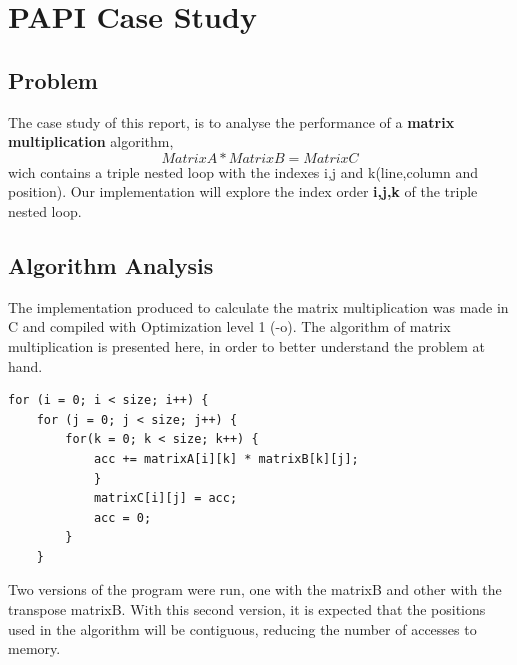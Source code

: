 \documentclass[a4paper,10pt,openright,openbib]{article}
\begin{document}
\section{PAPI Case Study}
\subsection{Problem}
The case study of this report, is to analyse the performance of a \textbf{matrix multiplication} algorithm, \begin{equation}Matrix A * Matrix B = Matrix C\end{equation} wich contains a triple nested loop with the indexes i,j and k(line,column and position). Our implementation will explore the index order \textbf{i,j,k} of the triple nested loop.

\subsection{Algorithm Analysis}
The implementation produced to calculate the matrix multiplication was made in C and compiled with Optimization level 1 (-o).
The algorithm of matrix multiplication is presented here, in order to better understand the problem at hand.

\begin{verbatim}
for (i = 0; i < size; i++) {
    for (j = 0; j < size; j++) {
        for(k = 0; k < size; k++) {
            acc += matrixA[i][k] * matrixB[k][j];				
            }		
            matrixC[i][j] = acc;	
            acc = 0;
        }
    }
\end{verbatim}

Two versions of the program were run, one with the matrixB and other with the transpose matrixB. With this second version, it is expected that the positions used in the algorithm will be contiguous, reducing the number of accesses to memory. 
\end{document}
